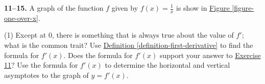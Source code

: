 \documentclass[10pt,oneside,]{book}
\theoremstyle{plain}
\theoremstyle{definition}
\numberwithin{equation}{section}
\newcounter{figstack}
\newcounter{figindex}
\newlength\fight
\newcommand\pushValignCaptionBottom[5][b]{%
\stepcounter{figstack}%
\expandafter\def\csname %
figalign\romannumeral\value{figstack}\endcsname{#1}%
\expandafter\def\csname %
figtype\romannumeral\value{figstack}\endcsname{#2}%
\expandafter\def\csname %
figwd\romannumeral\value{figstack}\endcsname{#3}%
\expandafter\def\csname %
figcontent\romannumeral\value{figstack}\endcsname{#4}%
\expandafter\def\csname %
figcap\romannumeral\value{figstack}\endcsname{#5}%
\setbox0=\hbox{%
\begin{#2}{#3}#4\end{#2}}%
\ifdim\dimexpr\ht0+\dp0\relax>\fight\global\setlength{\fight}{%
\dimexpr\ht0+\dp0\relax}\fi%
}
\newcommand\popValignCaptionBottom{%
\setcounter{figindex}{0}%
\hfill%
\whiledo{\value{figindex}<\value{figstack}}{%
\stepcounter{figindex}%
\def\tmp{\csname figwd\romannumeral\value{figindex}\endcsname}%
\begin{\csname figtype\romannumeral\value{figindex}\endcsname}[t]{\tmp}%
\centering%
\stackinset{c}{}%
{\csname figalign\romannumeral\value{figindex}\endcsname}{}%
{\csname figcontent\romannumeral\value{figindex}\endcsname}%
{\rule{0pt}{\fight}}\par%
\csname figcap\romannumeral\value{figindex}\endcsname%
\end{\csname figtype\romannumeral\value{figindex}\endcsname}%
\hfill%
}%
\setcounter{figstack}{0}%
\setlength{\fight}{0pt}%
\hfill%
}
\newcommand{\fe}[2]{#1\mathopen{}\left(#2\right)\mathclose{}}
\newcommand{\fd}[1]{#1'}
\begin{document}
\begin{exerciselist}
\begin{figure}
\end{figure}
\par\smallskip
\textbf{11--15. }\hypertarget{exercisegroup-48}{\null}A graph of the function \(f\) given by \(\fe{f}{x}=\frac{1}{x}\) is show in \hyperref[figure-one-over-x]{Figure \ref{figure-one-over-x}}.%
\par
\begin{exercisegroup}(1)
\exercise[11.]\hypertarget{exercise-negative-derivative-of-one-over-x}{\null}Except at \(0\), there is something that is always true about the value of \(\fd{f}\); what is the common trait?%
\exercise[12.]\hypertarget{exercise-derivative-of-one-over-x}{\null}Use \hyperref[definition-first-derivative]{Definition \ref{definition-first-derivative}} to find the formula for \(\fe{\fd{f}}{x}\).%
\exercise[13.]\hypertarget{exercise-241}{\null}Does the formula for \(\fe{\fd{f}}{x}\) support your answer to \hyperlink{exercise-negative-derivative-of-one-over-x}{Exercise 11}?%
\exercise[14.]\hypertarget{exercise-asymptotes-one-over-x}{\null}Use the formula for \(\fe{\fd{f}}{x}\) to determine the horizontal and vertical asymptotes to the graph of \(y=\fe{\fd{f}}{x}\).%

\end{exercisegroup}
\end{exerciselist}
\end{document}
